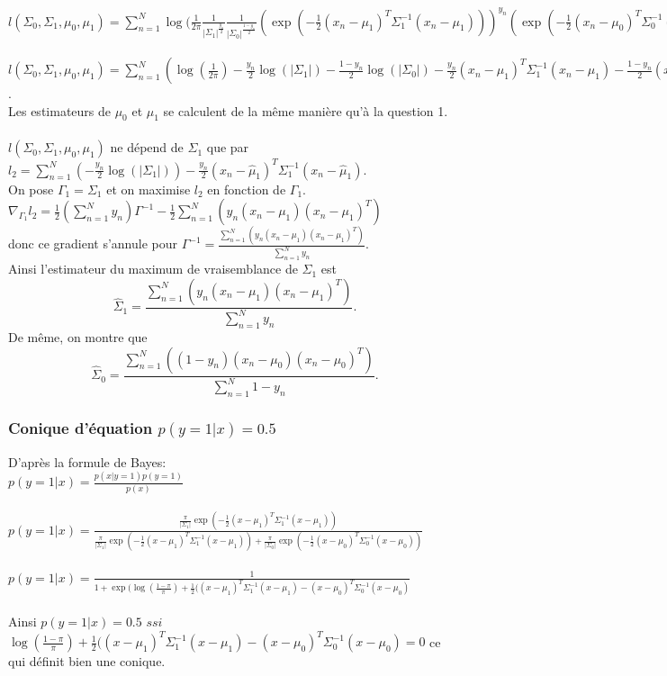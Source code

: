 \documentclass{article}
\begin{document}
$l(\Sigma_{0}, \Sigma_{1}, \mu_0, \mu_1) = \sum_{n=1}^{N} \log(\frac{1}{2\pi}\frac{1}{|\Sigma_{1}|^{\frac{y_{n}}{2}}}\frac{1}{|\Sigma_{0}|^{\frac{1-y_{n}}{2}}} (\exp(-\frac{1}{2}(x_{n}-\mu_{1})^{T}\Sigma_{1}^{-1}(x_{n}-\mu_{1})))^{y_{n}}(\exp(-\frac{1}{2}(x_{n}-\mu_{0})^{T}\Sigma_{0}^{-1}(x_{n}-\mu_{0})))^{1-y_{n}}$ \\ \\
$l(\Sigma_{0}, \Sigma_{1}, \mu_0, \mu_1) = \sum_{n=1}^{N} (\log(\frac{1}{2\pi})-\frac{y_{n}}{2}\log(|\Sigma_{1}|)-\frac{1-y_{n}}{2}\log(|\Sigma_{0}|)-\frac{y_{n}}{2}(x_{n}-\mu_{1})^{T}\Sigma_{1}^{-1}(x_{n}-\mu_{1})-\frac{1-y_{n}}{2}(x_{n}-\mu_{0})^{T}\Sigma-{0}^{-1}(x_{n}-\mu_{0}))$.\\
Les estimateurs de $\mu_0$ et $\mu_1$ se calculent de la même manière qu'à la question 1.\\\\
$l(\Sigma_{0}, \Sigma_{1}, \mu_0, \mu_1)$ ne dépend de $\Sigma_{1}$ que par $l_{2}=\sum_{n=1}^{N}(-\frac{y_{n}}{2}\log(|\Sigma_{1}|))-\frac{y_{n}}{2}(x_{n}- \hat {\mu}_{1})^{T}\Sigma_{1}^{-1}(x_{n}-\hat {\mu}_{1})$. \\
On pose $\Gamma_{1} = \Sigma_1$ et on maximise $l_{2}$ en fonction de $\Gamma_{1}$. \\
$\nabla_{\Gamma_{1}}l_{2}= \frac{1}{2}(\sum_{n=1}^{N}y_{n})\Gamma^{-1}-\frac{1}{2}\sum_{n=1}^{N}(y_{n}(x_{n}-\mu_{1})(x_{n}-\mu_{1})^{T})$\\
donc ce gradient s'annule pour $\Gamma^{-1}=\frac{\sum_{n=1}^{N}(y_{n}(x_{n}-\mu_{1})(x_{n}-\mu_{1})^{T})}{\sum_{n=1}^{N}y_{n}}$.\\
Ainsi l'estimateur du maximum de vraisemblance de $\Sigma_{1}$ est 
$$\hat{\Sigma}_{1} = \frac{\sum_{n=1}^{N}(y_{n}(x_{n}-\mu_{1})(x_{n}-\mu_{1})^{T})}{\sum_{n=1}^{N}y_{n}}.$$
De même, on montre que $$\hat{\Sigma}_{0} = \frac{\sum_{n=1}^{N}((1-y_{n})(x_{n}-\mu_{0})(x_{n}-\mu_{0})^{T})}{\sum_{n=1}^{N}1-y_{n}}.$$

\subsubsection{Conique d'équation $p(y=1|x)=0.5$}
D'après la formule de Bayes:\\
$p(y=1|x)=\frac{p(x|y=1)p(y=1)}{p(x)}$\\\\
$p(y=1|x)=\frac{\frac{\pi}{|\Sigma_{1}|}\exp(-\frac{1}{2}(x-\mu_{1})^{T}\Sigma_{1}^{-1}(x-\mu_{1}))}{\frac{\pi}{|\Sigma_{1}|}\exp(-\frac{1}{2}(x-\mu_{1})^{T}\Sigma_{1}^{-1}(x-\mu_{1})) + \frac{\pi}{|\Sigma_{0}|}\exp(-\frac{1}{2}(x-\mu_{0})^{T}\Sigma_{0}^{-1}(x-\mu_{0}))}$\\\\
$p(y=1|x)=\frac{1}{1+\exp(\log(\frac{1-\pi}{\pi})+\frac{1}{2}((x-\mu_{1})^{T}\Sigma_{1}^{-1}(x-\mu_{1}) - (x-\mu_{0})^{T}\Sigma_{0}^{-1}(x-\mu_{0})}$\\\\
Ainsi $p(y=1|x)=0.5$ $ssi$ $\log(\frac{1-\pi}{\pi})+\frac{1}{2}((x-\mu_{1})^{T}\Sigma_{1}^{-1}(x-\mu_{1}) - (x-\mu_{0})^{T}\Sigma_{0}^{-1}(x-\mu_{0}) = 0$ ce qui définit bien une conique.
\end{document}
